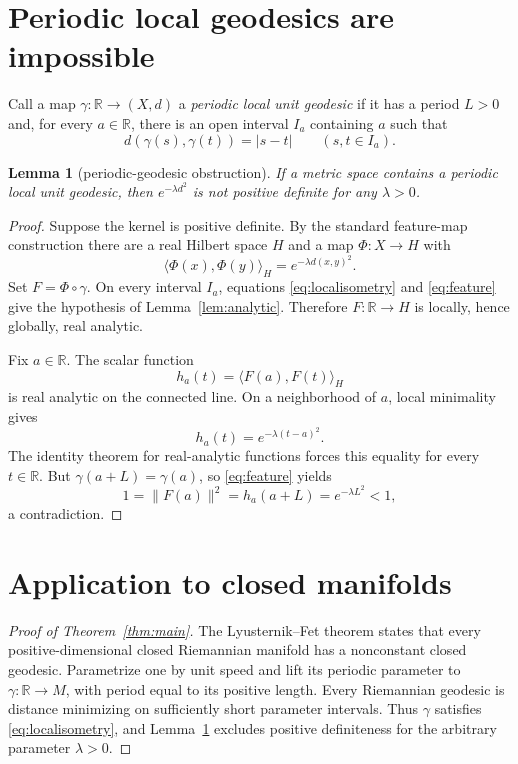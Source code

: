 \documentclass[11pt]{article}
\newtheorem{lemma}[theorem]{Lemma}
\theoremstyle{remark}
\newcommand{\R}{\mathbb R}
\begin{document}
\section{Periodic local geodesics are impossible}

Call a map $\gamma:\R\to(X,d)$ a \emph{periodic local unit geodesic} if it
has a period $L>0$ and, for every $a\in\R$, there is an open interval $I_a$
containing $a$ such that
\begin{equation}\label{eq:localisometry}
 d(\gamma(s),\gamma(t))=|s-t|\qquad(s,t\in I_a).
\end{equation}

\begin{lemma}[periodic-geodesic obstruction]\label{lem:periodic}
If a metric space contains a periodic local unit geodesic, then
$e^{-\lambda d^2}$ is not positive definite for any $\lambda>0$.
\end{lemma}

\begin{proof}
Suppose the kernel is positive definite.  By the standard feature-map
construction there are a real Hilbert space $H$ and a map $\Phi:X\to H$ with
\begin{equation}\label{eq:feature}
 \langle\Phi(x),\Phi(y)\rangle_H=e^{-\lambda d(x,y)^2}.
\end{equation}
Set $F=\Phi\circ\gamma$.  On every interval $I_a$, equations
\eqref{eq:localisometry} and \eqref{eq:feature} give the hypothesis of
Lemma~\ref{lem:analytic}.  Therefore $F:\R\to H$ is locally, hence globally,
real analytic.

Fix $a\in\R$.  The scalar function
\[
 h_a(t)=\langle F(a),F(t)\rangle_H
\]
is real analytic on the connected line.  On a neighborhood of $a$, local
minimality gives
\[
 h_a(t)=e^{-\lambda(t-a)^2}.
\]
The identity theorem for real-analytic functions forces this equality for
every $t\in\R$.  But $\gamma(a+L)=\gamma(a)$, so \eqref{eq:feature} yields
\[
 1=\|F(a)\|^2=h_a(a+L)=e^{-\lambda L^2}<1,
\]
a contradiction.
\end{proof}

\section{Application to closed manifolds}

\begin{proof}[Proof of Theorem~\ref{thm:main}]
The Lyusternik--Fet theorem \cite{LF} states that every
positive-dimensional closed Riemannian manifold has a nonconstant closed
geodesic.  Parametrize one by unit speed and lift its periodic parameter to
$\gamma:\R\to M$, with period equal to its positive length.  Every
Riemannian geodesic is distance minimizing on sufficiently short parameter
intervals.  Thus $\gamma$ satisfies \eqref{eq:localisometry}, and
Lemma~\ref{lem:periodic} excludes positive definiteness for the arbitrary
parameter $\lambda>0$.
\end{proof}
\end{document}
